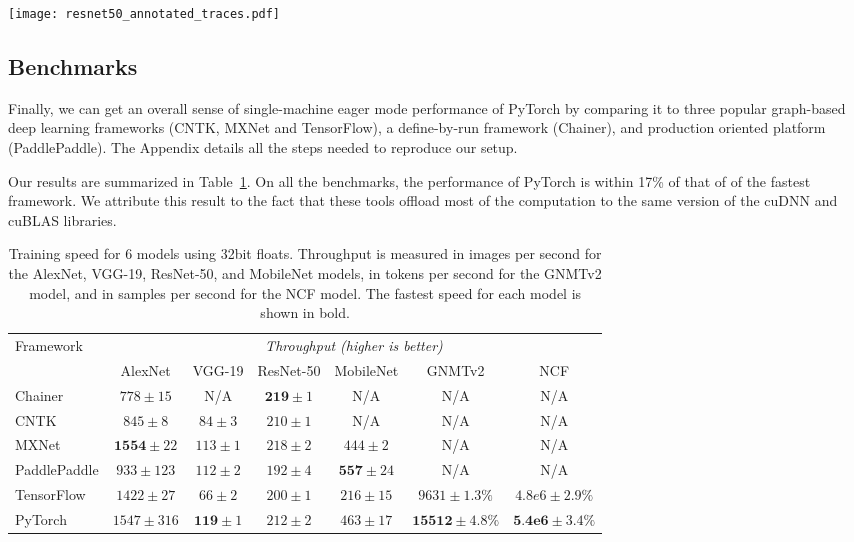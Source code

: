 \begin{center}
  \texttt{[image: resnet50\_annotated\_traces.pdf]}
\end{center}


\subsection{Benchmarks}

Finally, we can get an overall sense of single-machine eager mode performance of PyTorch by comparing it to three popular graph-based deep learning frameworks (CNTK, MXNet and TensorFlow), a define-by-run framework (Chainer), and production oriented platform (PaddlePaddle). The Appendix details all the steps needed to reproduce our setup.

Our results are summarized in Table~\ref{detailed_perf_results}. On all the benchmarks, the performance of PyTorch is within 17\% of that of of the fastest framework. We attribute this result to the fact that these tools offload most of the computation to the same version of the cuDNN and cuBLAS libraries.
\begin{table}[ht!]
\small
\centering
\begin{tabular}{l|c c c c c c}
 \toprule
 \multirow{2}{4.6em}{Framework} & \multicolumn{6}{c}{\it Throughput (higher is better)} \\
  & AlexNet & VGG-19 & ResNet-50 & MobileNet & GNMTv2 & NCF \\
\midrule

Chainer & $778 \pm 15$ & N/A & $\textbf{219} \pm 1$ & N/A & N/A & N/A \\
 CNTK & $845 \pm{8} $ & $ 84 \pm{3} $ & $210 \pm{1}$ & N/A & N/A & N/A \\
 MXNet & $\textbf{1554} \pm 22$ & $113 \pm 1$ & $218 \pm 2$ & $444 \pm 2$ & N/A & N/A \\
 PaddlePaddle  & $933\pm{123}$ & $112 \pm{2}$ & $192 \pm{4}$ & $\textbf{557}\pm{24}$ & N/A & N/A \\
 TensorFlow & $1422 \pm 27$ & $66 \pm 2$ & $200 \pm 1$ & $216 \pm 15 $ & $9631 \pm 1.3\%$ & $4.8e6 \pm 2.9\%$\\
 PyTorch & $1547 \pm 316$ & $\textbf{119} \pm 1$ & $212 \pm 2$ & $463 \pm 17$ & $\textbf{15512} \pm 4.8\%$ & $\textbf{5.4e6} \pm 3.4\%$\\

\bottomrule

\end{tabular}

 \caption{
  Training speed for 6 models using 32bit floats. Throughput is measured in images per second for the  AlexNet, VGG-19, ResNet-50, and MobileNet models, in tokens per second for the GNMTv2 model, and in samples per second for the NCF model. The fastest speed for each model is shown in bold.
  }
  \label{detailed_perf_results}

\end{table}

